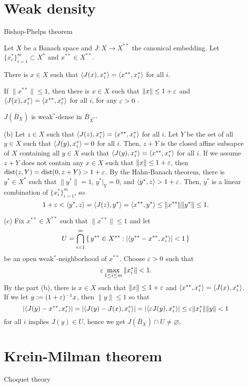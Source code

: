 \documentclass{../note}
\begin{document}
\section{Weak density}
Bishop-Phelps theorem
\begin{prb}
Let $X$ be a Banach space and $J:X\to X^{**}$ the canonical embedding.
Let $\{x_i^*\}_{i=1}^m\subset X^*$ and $x^{**}\in X^{**}$.
\begin{parts}
\item There is $x\in X$ such that $\langle J(x),x_i^*\rangle=\langle x^{**},x_i^*\rangle$ for all $i$.
\item If $\|x^{**}\|\le1$, then there is $x\in X$ such that $\|x\|\le1+\varepsilon$ and $\langle J(x),x_i^*\rangle=\langle x^{**},x_i^*\rangle$ for all $i$, for any $\varepsilon>0$ .
\item $J(\bar B_X)$ is weak$^*$-dense in $\bar B_{X^{**}}$
\end{parts}
\end{prb}
\begin{pf}
(b)
Let $z\in X$ such that $\langle J(z),x_i^*\rangle=\langle x^{**},x_i^*\rangle$ for all $i$.
Let $Y$ be the set of all $y\in X$ such that $\langle J(y),x_i^*\rangle=0$ for all $i$.
Then, $z+Y$ is the closed affine subsapce of $X$ containing all $y\in X$ such that $\langle J(y),x_i^*\rangle=\langle x^{**},x_i^*\rangle$ for all $i$.
If we assume $z+Y$ does not contain any $x\in X$ such that $\|x\|\le1+\varepsilon$, then $\operatorname{dist}(z,Y)=\operatorname{dist}(0,z+Y)>1+\varepsilon$.
By the Hahn-Banach theorem, there is $y^*\in X^*$ such that $\|y^*\|=1$, $y^*|_Y=0$, and $\langle y^*,z\rangle>1+\varepsilon$.
Then, $y^*$ is a linear combination of $\{x_i^*\}_{i=1}^m$, so
\[1+\varepsilon<\langle y^*,z\rangle=\langle J(z),y^*\rangle=\langle x^{**},y^*\rangle\le\|x^{**}\|\|y^*\|\le1.\]

(c)
Fix $x^{**}\in X^{**}$ such that $\|x^{**}\|\le1$ and let
\[U=\bigcap_{i=1}^m\,\{\,y^{**}\in X^{**}:|\langle y^{**}-x^{**},x_i^*\rangle|<1\,\}\]
be an open weak$^*$-neighborhood of $x^{**}$.
Choose $\varepsilon>0$ such that
\[\varepsilon\max_{1\le i\le m}\|x_i^*\|<1.\]
By the part (b), there is $x\in X$ such that $\|x\|\le1+\varepsilon$ and $\langle x^{**},x_i^*\rangle=\langle J(x),x_i^*\rangle$.
If we let $y:=(1+\varepsilon)^{-1}x$, then $\|y\|\le 1$ so that
\[|\langle J(y)-x^{**},x_i^*\rangle|=|\langle J(y)-J(x),x_i^*\rangle|=|\langle\varepsilon J(y),x_i^*\rangle|\le\varepsilon\|x_i^*\|\|y\|<1\]
for all $i$ implies $J(y)\in U$, hence we get $J(\bar B_X)\cap U\ne\varnothing$.
\end{pf}


\section{Krein-Milman theorem}
Choquet theory
\end{document}
